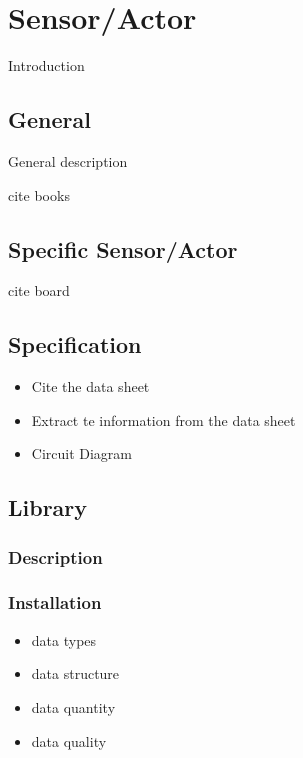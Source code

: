 %
%

\chapter{Sensor/Actor}

Introduction

\section{General}

General description

cite books

\section{Specific Sensor/Actor}

cite board

\section{Specification}

\begin{itemize}
  \item Cite the data sheet
  \item Extract te information from the data sheet
  \item Circuit Diagram
\end{itemize}

\section{Library}

\subsection{Description}

\subsection{Installation}

\begin{itemize}
    \item data types
    \item data structure
    \item data quantity
    \item data quality
\end{itemize}

